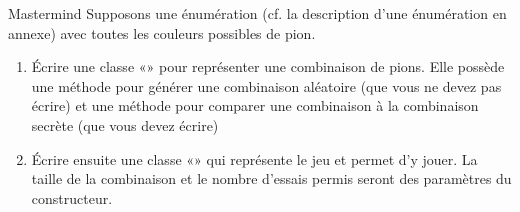 \begin{Exercice}{Mastermind}
	\medskip
	Supposons une énumération 
	(cf. la description d'une énumération en annexe) 
	avec toutes les couleurs possibles de pion.

	\begin{enumerate}[label=\alph*)]
		\item
			Écrire une classe «» pour
			représenter une combinaison de  pions. Elle
			possède une méthode pour générer une combinaison aléatoire (que vous ne
			devez pas écrire) et une méthode pour comparer une combinaison à la
			combinaison secrète (que vous devez écrire)
		\item
			Écrire ensuite une classe «» qui
			représente le jeu et permet d’y jouer. La taille de la combinaison et
			le nombre d’essais permis seront des paramètres du constructeur.
	\end{enumerate}
\end{Exercice}




